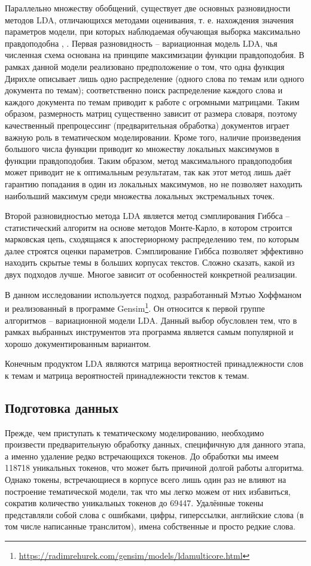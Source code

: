 Параллельно множеству обобщений, существует две основных разновидности методов LDA, отличающихся методами оценивания, т. е. нахождения значения параметров модели, при которых наблюдаемая обучающая выборка максимально правдоподобна \cite{kolcovaJJ}, \cite[стр. 1]{HoffmanBB10}. Первая разновидность -- вариационная модель LDA, чья численная схема основана на принципе максимизации функции правдоподобия. В рамках данной модели реализовано предположение о том, что одна функция Дирихле описывает лишь одно распределение (одного слова по темам или одного документа по темам); соответственно поиск распределение каждого слова и каждого документа по темам приводит к работе с огромными матрицами. Таким образом, размерность матриц существенно зависит от размера словаря, поэтому качественный препроцессинг (предварительная обработка) документов играет важную роль в тематическом моделировании. Кроме того, наличие произведения большого числа функции приводит ко множеству локальных максимумов в функции правдоподобия. Таким образом, метод максимального правдоподобия может приводит не к оптимальным результатам, так как этот метод лишь даёт гарантию попадания в один из локальных максимумов, но не позволяет находить наибольший максимум среди множества локальных экстремальных точек.

Второй разновидностью метода LDA является метод сэмплирования Гиббса -- статистический алгоритм на основе методов Монте-Карло, в котором строится марковская цепь, сходящаяся к апостериорному распределению тем, по которым далее строятся оценки параметров. Сэмплирование Гиббса позволяет эффективно находить скрытые темы в больших корпусах текстов. Сложно сказать, какой из двух подходов лучше. Многое зависит от особенностей конкретной реализации.

В данном исследовании используется подход, разработанный Мэтью Хоффманом \cite{HoffmanBB10} и реализованный в программе Gensim\footnote{\href{https://radimrehurek.com/gensim/models/ldamulticore.html}{https://radimrehurek.com/gensim/models/ldamulticore.html}}. Он относится к первой группе алгоритмов -- вариационной модели LDA. Данный выбор обусловлен тем, что в рамках выбранных инструментов эта программа является самым популярной и хорошо документированным вариантом.

Конечным продуктом LDA являются матрица вероятностей принадлежности слов к темам и матрица вероятностей принадлежности текстов к темам.

\subsection{Подготовка данных}
Прежде, чем приступать к тематическому моделированию, необходимо произвести предварительную обработку данных, специфичную для данного этапа, а именно удаление редко встречающихся токенов. До обработки мы имеем 118718 уникальных токенов, что может быть причиной долгой работы алгоритма. Однако токены, встречающиеся в корпусе всего лишь один раз не влияют на построение тематической модели, так что мы легко можем от них избавиться, сократив количество уникальных токенов до 69447. Удалённые токены представляли собой слова с ошибками, цифры, гиперссылки, английские слова (в том числе написанные транслитом), имена собственные и просто редкие слова.

